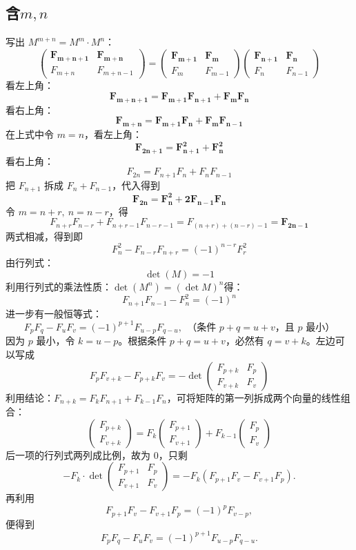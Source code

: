 \subsection{\texorpdfstring{含$m,n$}{含m,n}}
写出 $M^{m+n} = M^m \cdot M^n$：$$ \begin{pmatrix} \mathbf{F_{m+n+1}} & \mathbf{F_{m+n}} \\ F_{m+n} & F_{m+n-1} \end{pmatrix} = \begin{pmatrix} \mathbf{F_{m+1}} & \mathbf{F_m} \\ F_m & F_{m-1} \end{pmatrix} \begin{pmatrix} \mathbf{F_{n+1}} & \mathbf{F_n} \\ F_n & F_{n-1} \end{pmatrix} $$
看左上角：\[\mathbf{F_{m+n+1} = F_{m+1}F_{n+1} + F_m F_n}\]
看右上角：\[\mathbf{F_{m+n} = F_{m+1}F_n + F_m F_{n-1}}\]
在上式中令 $m=n$，看左上角：\[\mathbf{F_{2n+1} = F_{n+1}^2 + F_n^2}\]
看右上角：\[F_{2n} = F_{n+1}F_n + F_n F_{n-1}\]
把 $F_{n+1}$ 拆成 $F_n + F_{n-1}$，代入得到 \[\mathbf{F_{2n} = F_n^2 + 2F_{n-1}F_n}\]
令 $m=n+r,\ n=n-r$，得
\[F_{n+r}F_{n-r} + F_{n+r-1}F_{n-r-1} = F_{(n+r)+(n-r)-1} = \mathbf{F_{2n-1}}\]
两式相减，得到即 \[F_n^2 - F_{n-r}F_{n+r} = (-1)^{n-r}F_r^2\]
由行列式：\[\det(M) = -1\]利用行列式的乘法性质：$\det(M^n) = (\det M)^n$得：
\[F_{n+1}F_{n-1} - F_n^2=(-1)^n\]
进一步有一般恒等式：
\[F_pF_q - F_uF_v = (-1)^{p+1}F_{u-p}F_{q-u},~~\text{（条件 $p+q = u+v$，且 $p$ 最小）}\] 
因为 $p$ 最小，令 $k = u-p$。根据条件 $p+q = u+v$，必然有 $q = v+k$。左边可以写成 
\[F_p F_{v+k} - F_{p+k} F_v= -\det \begin{pmatrix} F_{p+k} & F_p \\ F_{v+k} & F_v \end{pmatrix} \]
利用结论：$F_{n+k} = F_k F_{n+1} + F_{k-1} F_n$，可将矩阵的第一列拆成两个向量的线性组合：
$$ \begin{pmatrix} F_{p+k} \\ F_{v+k} \end{pmatrix} = F_k \begin{pmatrix} F_{p+1} \\ F_{v+1} \end{pmatrix} + F_{k-1} \begin{pmatrix} F_p \\ F_v \end{pmatrix} $$
后一项的行列式两列成比例，故为 \(0\)，只剩
\[
- F_k \cdot \det \begin{pmatrix} F_{p+1} & F_p \\ F_{v+1} & F_v \end{pmatrix}
= -F_k (F_{p+1}F_v - F_{v+1}F_p).
\]
再利用
\[
F_{p+1}F_v - F_{v+1}F_p = (-1)^p F_{v-p},
\]
便得到
\[
F_pF_q - F_uF_v = (-1)^{p+1}F_{u-p}F_{q-u}.
\]


